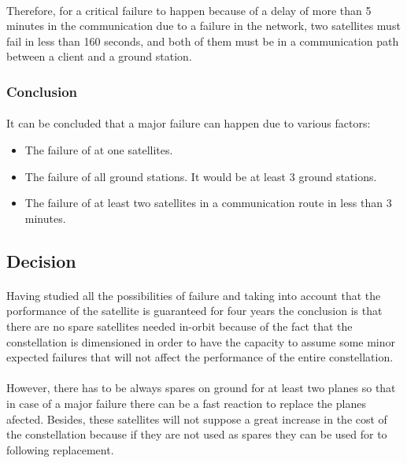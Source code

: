 \paragraph{}Therefore, for a critical failure to happen because of a delay of more than 5 minutes in the communication due to a failure in the network, two satellites must fail in less than 160 seconds, and both of them must be in a communication path between a client and a ground station.

\subsubsection{Conclusion}

\paragraph{}It can be concluded that a major failure can happen due to various factors:
\begin{itemize}
\item The failure of at one satellites.
\item The failure of all ground stations. It would be at least 3 ground stations.
\item The failure of at least two satellites in a communication route in less than 3 minutes.
\end{itemize}


\subsection{Decision}
\paragraph{}Having studied all the possibilities of failure and taking into account that the porformance of the satellite is guaranteed for four years the conclusion is that there are no spare satellites needed in-orbit because of the fact that the constellation is dimensioned in order to have the capacity to assume some minor expected failures that will not affect the performance of the entire constellation.

\paragraph{}However, there has to be always spares on ground for at least two planes so that in case of a major failure there can be a fast reaction to replace the planes afected. Besides, these satellites will not suppose a great increase in the cost of the constellation because if they are not used as spares they can be used for to following replacement. 


 